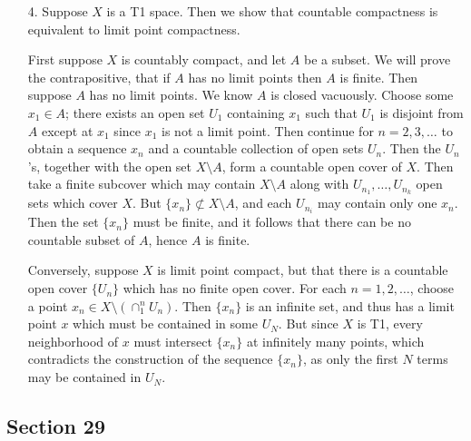 \documentclass[11pt, reqno]{article}
\theoremstyle{plain}
\theoremstyle{definition}
\theoremstyle{remark}
\begin{document}
\begin{enumerate}
    \item[4.] Suppose $X$ is a T1 space. Then we show that countable compactness is equivalent to limit point compactness.
    
    First suppose $X$ is countably compact, and let $A$ be a subset. We will prove the contrapositive, that if $A$ has no 
    limit points then $A$ is finite. Then suppose $A$ has no limit points. We know $A$ is closed vacuously. Choose some 
    $x_1 \in A$; there exists an open set $U_1$ containing $x_1$ such that $U_1$ is disjoint from $A$ except at $x_1$
    since $x_1$ is not a limit point. Then continue for $n = 2, 3, \dots$ to obtain a sequence $x_n$ and a countable 
    collection of open sets $U_n$. Then the $U_n$'s, together with the open set $X \setminus A$, form a countable 
    open cover of $X$. Then take a finite subcover which may contain $X\setminus A$ along with $U_{n_1}, \dots, U_{n_k}$
    open sets which cover $X$. But $\{x_n\} \not\subset X\setminus A$, and each $U_{n_i}$ may contain only one $x_n$. Then 
    the set $\{x_n\}$ must be finite, and it follows that there can be no countable subset of $A$, hence $A$ is finite. 

    Conversely, suppose $X$ is limit point compact, but that there is a countable open cover $\{U_n\}$ which has no finite 
    open cover. For each $n = 1, 2, \dots$, choose a point $x_n \in X \setminus \left(\cap_1^n U_n\right)$. Then $\{x_n\}$ 
    is an infinite set, and thus has a limit point $x$ which must be contained in some $U_N$. But since $X$ is T1, every 
    neighborhood of $x$ must intersect $\{x_n\}$ at infinitely many points, which contradicts the construction of the sequence
    $\{x_n\}$, as only the first $N$ terms may be contained in $U_N$.
\end{enumerate}

\subsection*{Section 29}
\end{document}
